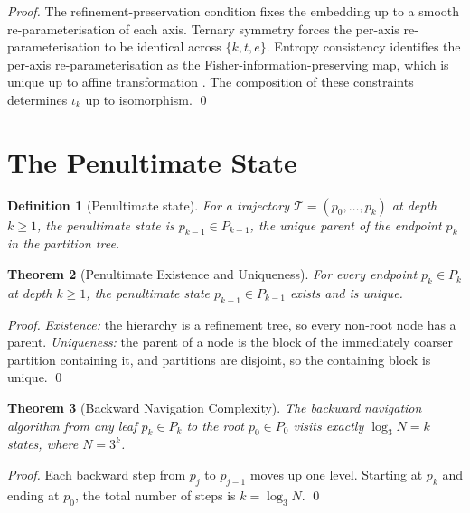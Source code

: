 \documentclass[twocolumn,a4paper]{article}
\newtheorem{theorem}{Theorem}[section]
\newtheorem{definition}[theorem]{Definition}
\newcommand{\Trajec}{\mathcal{T}}
\begin{document}
\begin{proof}
The refinement-preservation condition fixes the embedding up to a smooth re-parameterisation of each axis. Ternary symmetry forces the per-axis re-parameterisation to be identical across $\{k,t,e\}$. Entropy consistency identifies the per-axis re-parameterisation as the Fisher-information-preserving map, which is unique up to affine transformation \citep{amari2016information,cencov2000statistical}. The composition of these constraints determines $\iota_{k}$ up to isomorphism. \qed
\end{proof}

\section{The Penultimate State}
\label{sec:penultimate-state}

\begin{definition}[Penultimate state]
\label{def:penultimate-state}
For a trajectory $\Trajec=(p_{0},\ldots,p_{k})$ at depth $k\geq 1$, the \emph{penultimate state} is $p_{k-1}\in P_{k-1}$, the unique parent of the endpoint $p_{k}$ in the partition tree.
\end{definition}

\begin{theorem}[Penultimate Existence and Uniqueness]
\label{thm:penultimate}
For every endpoint $p_{k}\in P_{k}$ at depth $k\geq 1$, the penultimate state $p_{k-1}\in P_{k-1}$ exists and is unique.
\end{theorem}

\begin{proof}
\emph{Existence:} the hierarchy is a refinement tree, so every non-root node has a parent. \emph{Uniqueness:} the parent of a node is the block of the immediately coarser partition containing it, and partitions are disjoint, so the containing block is unique. \qed
\end{proof}

\begin{theorem}[Backward Navigation Complexity]
\label{thm:backward-complexity}
The backward navigation algorithm from any leaf $p_{k}\in P_{k}$ to the root $p_{0}\in P_{0}$ visits exactly $\log_{3}N=k$ states, where $N=3^{k}$.
\end{theorem}

\begin{proof}
Each backward step from $p_{j}$ to $p_{j-1}$ moves up one level. Starting at $p_{k}$ and ending at $p_{0}$, the total number of steps is $k=\log_{3}N$. \qed
\end{proof}
\end{document}
